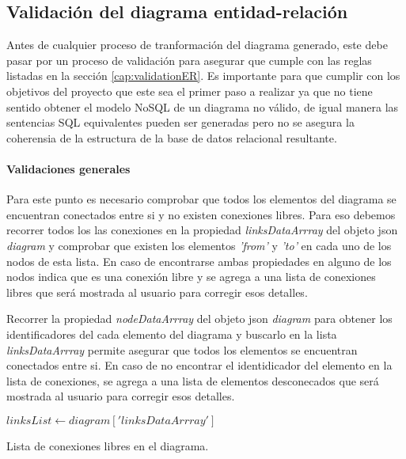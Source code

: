 \subsection{Validación del diagrama entidad-relación}

Antes de cualquier proceso de tranformación del diagrama generado, este debe pasar por un proceso de validación para asegurar que cumple con las reglas listadas en la sección \ref{cap:validationER}. Es importante para que cumplir con los objetivos del proyecto que este sea el primer paso a realizar ya que no tiene sentido obtener el modelo NoSQL de un diagrama no válido, de igual manera las sentencias SQL equivalentes pueden ser generadas pero no se asegura la coherensia de la estructura de la base de datos relacional resultante.

\paragraph*{Validaciones generales}

Para este punto es necesario comprobar que todos los elementos del diagrama se encuentran conectados entre si y no existen conexiones libres. Para eso debemos recorrer todos los las conexiones en la propiedad \textit{linksDataArrray} del objeto json \textit{diagram} y comprobar que existen los elementos \textit{'from'} y \textit{'to'} en cada uno de los nodos de esta lista. En caso de encontrarse ambas propiedades en alguno de los nodos indica que es una conexión libre y se agrega a una lista de conexiones libres que será mostrada al usuario para corregir esos detalles.

Recorrer la propiedad \textit{nodeDataArrray} del objeto json \textit{diagram} para obtener los identificadores del cada elemento del diagrama y buscarlo en la lista \textit{linksDataArrray} permite asegurar que todos los elementos se encuentran conectados entre si. En caso de no encontrar el identidicador del elemento en la lista de conexiones, se agrega a una lista de elementos desconecados que será mostrada al usuario para corregir esos detalles.


\begin{algorithm}[H]

  $linksList \gets diagram['linksDataArrray']$\\
  
  \caption{Lista de conexiones libres en el diagrama.}
\end{algorithm}

